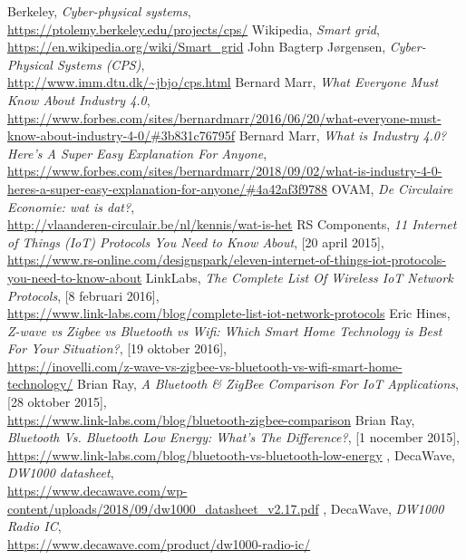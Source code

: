 \documentclass[11pt,a4paper,twoside]{article} %
\begin{document}
\begin{thebibliography}{9} %
	 Berkeley, \textit{Cyber-physical systems}, \\
	\url{https://ptolemy.berkeley.edu/projects/cps/}
	 Wikipedia, \textit{Smart grid}, \\
	\url{https://en.wikipedia.org/wiki/Smart_grid}
	 John Bagterp Jørgensen, \textit{Cyber-Physical Systems (CPS)}, \\
	\url{http://www.imm.dtu.dk/~jbjo/cps.html}
	 Bernard Marr, \textit{What Everyone Must Know About Industry 4.0}, \\
	\url{https://www.forbes.com/sites/bernardmarr/2016/06/20/what-everyone-must-know-about-industry-4-0/#3b831c76795f}
	 Bernard Marr, \textit{What is Industry 4.0? Here's A Super Easy Explanation For Anyone}, \\
	\url{https://www.forbes.com/sites/bernardmarr/2018/09/02/what-is-industry-4-0-heres-a-super-easy-explanation-for-anyone/#4a42af3f9788}
	 OVAM, \textit{De Circulaire Economie: wat is dat?}, \\
	\url{http://vlaanderen-circulair.be/nl/kennis/wat-is-het}
	 RS Components, \textit{11 Internet of Things (IoT) Protocols You Need to Know About}, [20 april 2015], \\
	\url{https://www.rs-online.com/designspark/eleven-internet-of-things-iot-protocols-you-need-to-know-about}
	 LinkLabs, \textit{The Complete List Of Wireless IoT Network Protocols}, [8 februari 2016], \\
	\url{https://www.link-labs.com/blog/complete-list-iot-network-protocols}
	 Eric Hines, \textit{Z-wave vs Zigbee vs Bluetooth vs Wifi: Which Smart Home Technology is Best For Your Situation?}, [19 oktober 2016], \\
	\url{https://inovelli.com/z-wave-vs-zigbee-vs-bluetooth-vs-wifi-smart-home-technology/}
	 Brian Ray, \textit{A Bluetooth \& ZigBee Comparison For IoT Applications}, [28 oktober 2015], \\
	\url{https://www.link-labs.com/blog/bluetooth-zigbee-comparison}
	Brian Ray, \textit{Bluetooth Vs. Bluetooth Low Energy: What's The Difference?}, [1 nocember 2015], \\
	\url{https://www.link-labs.com/blog/bluetooth-vs-bluetooth-low-energy}
	, DecaWave, \textit{DW1000 datasheet}, \\
	\url{https://www.decawave.com/wp-content/uploads/2018/09/dw1000_datasheet_v2.17.pdf}
	, DecaWave, \textit{DW1000 Radio IC}, \\
	\url{https://www.decawave.com/product/dw1000-radio-ic/}
\end{thebibliography}
\end{document}
